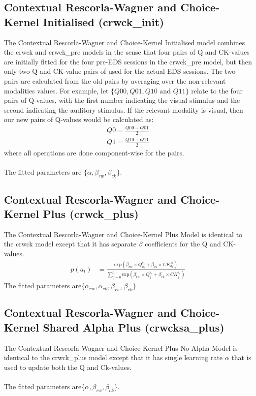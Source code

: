 \documentclass[12pt]{article}
\begin{document}
\subsection{Contextual Rescorla-Wagner and Choice-Kernel Initialised (crwck\_init)}
The Contextual Rescorla-Wagner and Choice-Kernel Initialised model combines the crwck and crwck\_pre models in the sense that four pairs of Q and CK-values are initially fitted for the four pre-EDS sessions in the crwck\_pre model, but then only two Q and CK-value pairs of used for the actual EDS sessions. The two pairs are calculated from the old pairs by averaging over the non-relevant modalities values. For example, let $\{Q00, Q01, Q10 \text{ and } Q11\}$ relate to the four pairs of Q-values, with the first number indicating the visual stimulus and the second indicating the auditory stimulus. If the relevant modality is visual, then our new pairs of Q-values would be calculated as:
\begin{align}
	Q0 = \frac{Q00 + Q01}{2}\\
	Q1 = \frac{Q10 + Q11}{2}
\end{align}
where all operations are done component-wise for the pairs.
\\\\
The fitted parameters are $\{\alpha, \beta_{rw}, \beta_{ck}\}$.

\subsection{Contextual Rescorla-Wagner and Choice-Kernel Plus (crwck\_plus)}
The Contextual Rescorla-Wagner and Choice-Kernel Plus Model is identical to the crwck model except that it has separate $\beta$ coefficients for the Q and CK-values.
\begin{align}
	p(a_t) &= \frac{\text{exp}\left(\beta_{rw} \times Q^{s_t}_{a_t} + \beta_{ck} \times CK^{s_t}_{a_t}\right)}{\sum_{j=0}^1 \text{exp}\left(\beta_{rw} \times Q^{s_t}_{j} + \beta_{ck} \times CK^{s_t}_{j}\right)}
\end{align}
The fitted parameters are$\{\alpha_{rw}, \alpha_{ck}, \beta_{rw}, \beta_{ck}\}$.


\subsection{Contextual Rescorla-Wagner and Choice-Kernel Shared Alpha Plus (crwcksa\_plus)}
The Contextual Rescorla-Wagner and Choice-Kernel Plus No Alpha Model is identical to the crwck\_plus model except that it has single learning rate $\alpha$ that is used to update both the Q and Ck-values.
\\\\
The fitted parameters are$\{\alpha, \beta_{rw}, \beta_{ck}\}$.
\end{document}
